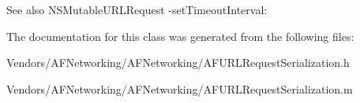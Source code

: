 \begin{DoxySeeAlso}{See also}
N\+S\+Mutable\+U\+R\+L\+Request -\/set\+Timeout\+Interval\+: 
\end{DoxySeeAlso}


The documentation for this class was generated from the following files\+:\begin{DoxyCompactItemize}
\item 
Vendors/\+A\+F\+Networking/\+A\+F\+Networking/A\+F\+U\+R\+L\+Request\+Serialization.\+h\item 
Vendors/\+A\+F\+Networking/\+A\+F\+Networking/A\+F\+U\+R\+L\+Request\+Serialization.\+m\end{DoxyCompactItemize}
